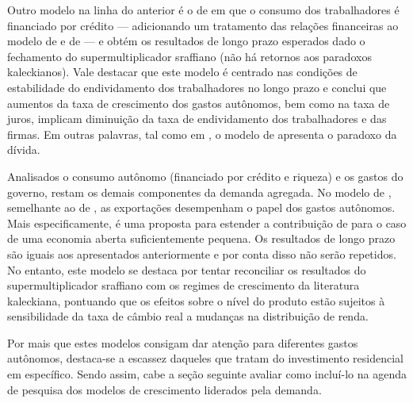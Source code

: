 Outro modelo na linha do anterior é o de \textcite{mandarino_financing_2018} em que o consumo dos trabalhadores é financiado por crédito --- adicionando um tratamento das relações financeiras ao modelo de \textcite{pariboni_household_2016} e de \textcite{fagundes_dinamica_2017} --- e obtém os resultados de longo prazo esperados dado o fechamento do supermultiplicador sraffiano (não há retornos aos paradoxos kaleckianos).
Vale destacar que este modelo é centrado nas condições de estabilidade do endividamento dos trabalhadores no longo prazo e conclui que aumentos da taxa de crescimento dos gastos autônomos, bem como na taxa de juros, implicam diminuição da taxa de endividamento dos trabalhadores e das firmas. 
Em outras palavras, tal como em \textcite{hein_autonomous_2018}, o modelo de \textcite{mandarino_financing_2018} apresenta o paradoxo da dívida.


Analisados o consumo autônomo (financiado por crédito e riqueza) e os gastos do governo, restam os demais componentes da demanda agregada.
No modelo de \textcite{nah_long-run_2017}, semelhante ao de \textcite{dejuan_hidden_2017}, as exportações desempenham o papel dos gastos autônomos. Mais especificamente, é uma proposta para estender a contribuição de \textcite{serrano_sraffian_1995} para o caso de uma economia aberta suficientemente pequena. Os resultados de longo prazo são iguais aos apresentados anteriormente e por conta disso não serão repetidos. No entanto, este modelo se destaca por tentar reconciliar os resultados do supermultiplicador sraffiano com os regimes de crescimento da literatura kaleckiana, pontuando que os efeitos sobre o nível do produto estão sujeitos à sensibilidade da taxa de câmbio real a mudanças na distribuição de renda. 


Por mais que estes modelos consigam dar atenção para diferentes gastos autônomos, destaca-se a escassez daqueles que tratam do investimento residencial em específico. 
Sendo assim, cabe a seção seguinte avaliar como incluí-lo na agenda de pesquisa dos modelos de crescimento liderados pela demanda.
